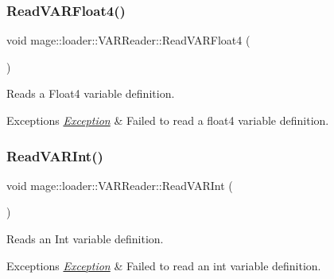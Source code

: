 \subsubsection{\texorpdfstring{Read\+V\+A\+R\+Float4()}{ReadVARFloat4()}}
{\footnotesize\ttfamily void mage\+::loader\+::\+V\+A\+R\+Reader\+::\+Read\+V\+A\+R\+Float4 (\begin{DoxyParamCaption}{ }\end{DoxyParamCaption})\hspace{0.3cm}{\ttfamily [private]}}

Reads a Float4 variable definition.


\begin{DoxyExceptions}{Exceptions}
{\em \hyperlink{classmage_1_1_exception}{Exception}} & Failed to read a float4 variable definition. \\
\hline
\end{DoxyExceptions}
\hypertarget{classmage_1_1loader_1_1_v_a_r_reader_a88a819066140cacd8ce494fca125e1e2}{}\label{classmage_1_1loader_1_1_v_a_r_reader_a88a819066140cacd8ce494fca125e1e2} 
\subsubsection{\texorpdfstring{Read\+V\+A\+R\+Int()}{ReadVARInt()}}
{\footnotesize\ttfamily void mage\+::loader\+::\+V\+A\+R\+Reader\+::\+Read\+V\+A\+R\+Int (\begin{DoxyParamCaption}{ }\end{DoxyParamCaption})\hspace{0.3cm}{\ttfamily [private]}}

Reads an Int variable definition.


\begin{DoxyExceptions}{Exceptions}
{\em \hyperlink{classmage_1_1_exception}{Exception}} & Failed to read an int variable definition. \\
\hline
\end{DoxyExceptions}
\hypertarget{classmage_1_1loader_1_1_v_a_r_reader_a4e84ca5a6fabcf2ea29fbf32a5bdf1c4}{}\label{classmage_1_1loader_1_1_v_a_r_reader_a4e84ca5a6fabcf2ea29fbf32a5bdf1c4} 

